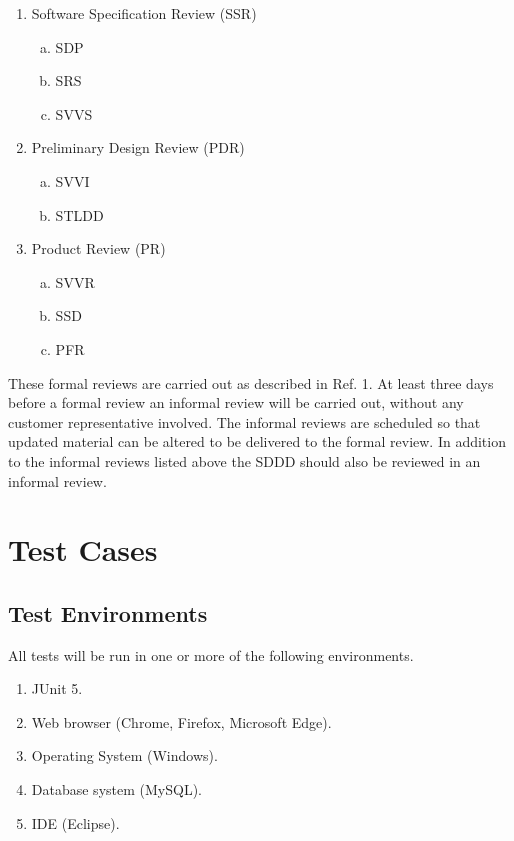 \documentclass{article}
\begin{document}
\begin{enumerate}
	\item Software Specification Review (SSR)
		\begin{enumerate}[a.] 
			\item SDP
			\item SRS 
			\item SVVS 
		\end{enumerate}
	\item Preliminary Design Review (PDR) 
		\begin{enumerate}[a.]
			\item SVVI
			\item STLDD
		\end{enumerate}
	\item Product Review (PR) 
		\begin{enumerate}[a.]
			\item SVVR 
			\item SSD 
			\item PFR 
		\end{enumerate}
\end{enumerate}

\noindent
These formal reviews are carried out as described in Ref. 1. At least three days before a formal review an informal review will be carried out, without any customer representative involved. The informal reviews are scheduled so that updated material can be altered to be delivered to the formal review. In addition to the informal reviews listed above the SDDD should also be reviewed in an informal review. 

\section{Test Cases}
	\subsection{Test Environments}
	All tests will be run in one or more of the following environments. 
		\begin{enumerate}
			\item JUnit 5.

			\item Web browser (Chrome, Firefox, Microsoft Edge).

			\item Operating System (Windows).

			\item Database system (MySQL).

			\item IDE (Eclipse).	
		\end{enumerate}
		
\end{document}
